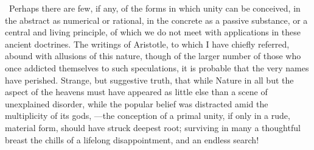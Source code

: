 \documentclass[oneside]{book}
\begin{document}
\ Perhaps there are few,
if any, of the forms in which unity can be conceived, in the abstract as numerical or rational, in the concrete as a passive substance, or a central and living principle, of which we do not
meet with applications in these ancient doctrines. The writings
of Aristotle, to which I have chiefly referred, abound with allusions of this nature, though of the larger number of those who
once addicted themselves to such speculations, it is probable that
the very names have perished. Strange, but suggestive truth,
that while Nature in all but the aspect of the heavens must have
appeared as little else than a scene of unexplained disorder, while
the popular belief was distracted amid the multiplicity of its gods,
---the conception of a primal unity, if only in a rude, material form,
should have struck deepest root; surviving in many a thoughtful breast the chills of a lifelong disappointment, and an endless
search!%
\end{document}
